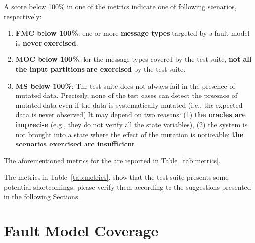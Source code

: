 A score below 100\% in one of the metrics indicate one of following scenarios, respectively:
\begin{enumerate}
\item \textbf{FMC below 100\%}: one or more \textbf{message types} targeted by a fault model is \textbf{never exercised}.
\item \textbf{MOC below 100\%}: for the message types covered by the test suite, \textbf{not all the input partitions} \textbf{are exercised} by the test suite.
\item \textbf{MS below 100\%}: The test suite does not always fail in the presence of mutated data. Precisely, none of the test cases can detect the presence of mutated data even if the data is systematically mutated (i.e., the expected data is never observed) It may depend on two reasons: (1) \textbf{the oracles are imprecise} (e.g., they do not verify all the state variables), (2) the system is not brought into a state where the effect of the mutation is noticeable: \textbf{the scenarios exercised are insufficient}.
\end{enumerate}

The aforementioned metrics for the \case are reported in Table~\ref{tab:metrics}.






\action The metrics in Table~\ref{tab:metrics}. show that the test suite presents some potential shortcomings, please verify them according to the suggestions presented in the following Sections.

\section{Fault Model Coverage}

